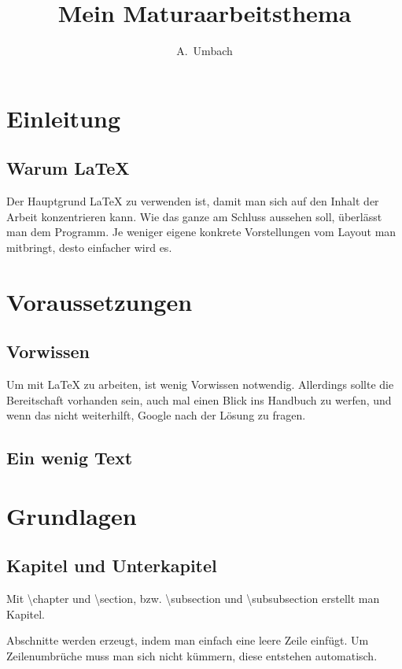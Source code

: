 \documentclass[a4paper,11pt]{report}
\author{A.~Umbach}
\title{Mein Maturaarbeitsthema}
\begin{document}
\maketitle
\tableofcontents

\chapter{Einleitung}
\section{Warum \LaTeX{}}
Der Hauptgrund \LaTeX{} zu verwenden ist, damit man sich auf den Inhalt der Arbeit konzentrieren kann. Wie das ganze am Schluss aussehen soll, überlässt man dem Programm. Je weniger eigene konkrete Vorstellungen vom Layout man mitbringt, desto einfacher wird es.

\chapter{Voraussetzungen}
\section{Vorwissen}
Um mit \LaTeX{} zu arbeiten, ist wenig Vorwissen notwendig. Allerdings sollte die Bereitschaft vorhanden sein, auch mal einen Blick ins Handbuch zu werfen, und wenn das nicht weiterhilft, Google nach der Lösung zu fragen.

\section{Ein wenig Text}
\blindtext

\chapter{Grundlagen}
\section{Kapitel und Unterkapitel}
\label{kapitelunterkapitel}
Mit \textbackslash chapter und \textbackslash section, bzw. \textbackslash subsection und \textbackslash subsubsection erstellt man Kapitel.

Abschnitte werden erzeugt, indem man einfach eine leere Zeile einfügt. Um
Zeilenumbrüche muss man sich nicht kümmern, diese entstehen automatisch.
\end{document}

